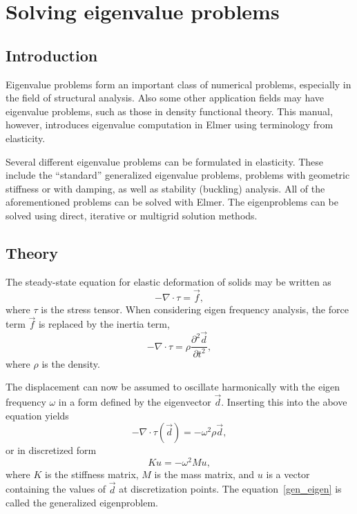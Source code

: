 \chapter{Solving eigenvalue problems}
\noindent

\section{Introduction}

Eigenvalue problems form an important class of numerical problems,
especially in the field of structural analysis. Also some other
application fields may have eigenvalue problems, such as those in
density functional theory. This manual, however, introduces eigenvalue
computation in Elmer using terminology from elasticity.

Several different eigenvalue problems can be formulated in
elasticity. These include the ``standard'' generalized eigenvalue
problems, problems with geometric stiffness or with damping, as well
as stability (buckling) analysis. All of the aforementioned problems
can be solved with Elmer. The eigenproblems can be solved using
direct, iterative or multigrid solution methods.


\section{Theory}

The steady-state equation for elastic deformation of solids may be
written as
\begin{equation}
-\nabla\cdot\tau = \vec{f},
\end{equation}
where $\tau$ is the stress tensor. When considering eigen frequency
analysis, the force term $\vec{f}$ is replaced by the inertia term,
\begin{equation}
-\nabla\cdot\tau = \rho\frac{\partial^2 \vec{d}}{\partial t^2},
\end{equation}
where $\rho$ is the density.

The displacement can now be assumed to oscillate harmonically with the
eigen frequency $\omega$ in a form defined by the eigenvector
$\vec{d}$. Inserting this into the above equation yields
\begin{equation}
-\nabla\cdot\tau(\vec{d}) = 
-\omega^2\rho\vec{d},
\end{equation}
or in discretized form
\begin{equation}
\label{gen_eigen}
Ku = -\omega^2Mu,
\end{equation}
where $K$ is the stiffness matrix, $M$ is the mass matrix, and $u$ is
a vector containing the values of $\vec{d}$ at discretization
points. The equation~\ref{gen_eigen} is called the generalized
eigenproblem.


